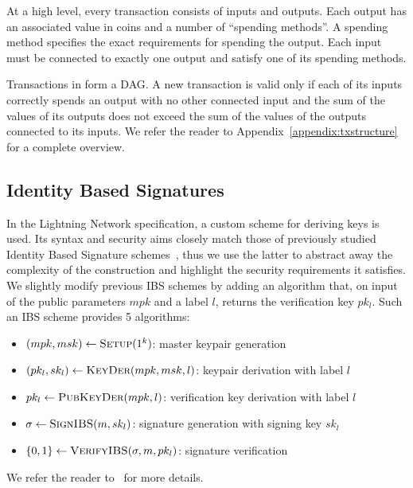     At a high level, every transaction consists of inputs and outputs. Each
    output has an associated value in coins and a number of ``spending
    methods''. A spending method specifies the exact requirements for spending
    the output. Each input must be connected to exactly one output and satisfy
    one of its spending methods.

    Transactions in \ledger{} form a DAG. A new transaction is valid only if
    each of its inputs correctly spends an output with no other connected input
    and the sum of the values of its outputs does not exceed the sum of the
    values of the outputs connected to its inputs. We refer the reader to
    Appendix~\ref{appendix:txstructure} for a complete overview.

  \subsection{Identity Based Signatures}
    In the Lightning Network specification, a custom scheme for deriving keys is
    used. Its syntax and security aims closely match those of previously studied
    Identity Based Signature schemes~\cite{ibsshamir,ibspaterson}, thus we use
    the latter to abstract away the complexity of the construction and highlight
    the security requirements it satisfies. We slightly modify previous IBS
    schemes by adding an algorithm that, on input of the public parameters $mpk$
    and a label $l$, returns the verification key $pk_l$. Such an IBS scheme
    provides 5 algorithms:
    \begin{itemize}
      \item $(mpk, msk) \leftarrow \textsc{Setup}(1^k)$: master keypair
      generation
      \item $(pk_l, sk_l) \leftarrow \textsc{KeyDer}(mpk, msk, l)$: keypair
      derivation with label $l$
      \item $pk_l \leftarrow \textsc{PubKeyDer}(mpk, l)$: verification key
      derivation with label $l$
      \item $\sigma \leftarrow \textsc{SignIBS}(m, sk_l)$: signature generation
      with signing key $sk_l$
      \item $\{0, 1\} \leftarrow \textsc{VerifyIBS}(\sigma, m, pk_l)$: signature
      verification
    \end{itemize}
    We refer the reader to~\cite{ibspaterson} for more details.  
